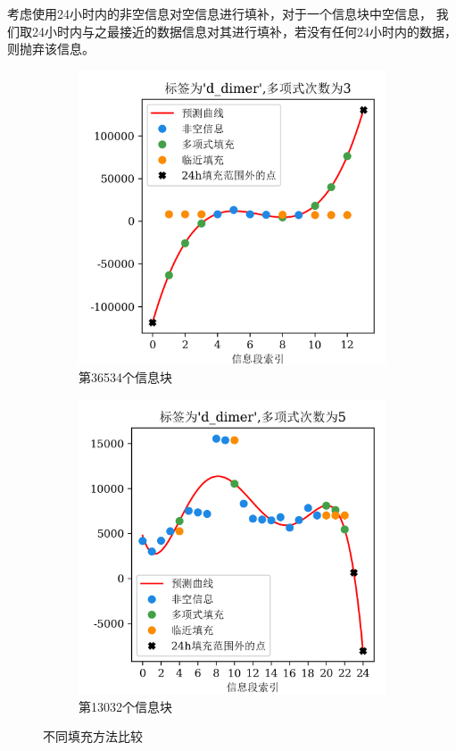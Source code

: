 \documentclass[12pt, a4paper, oneside]{ctexart}
\numberwithin{equation}{section}  %
\begin{document}
考虑使用24小时内的非空信息对空信息进行填补，对于一个信息块中空信息，
我们取24小时内与之最接近的数据信息对其进行填补，若没有任何24小时内的数据，则抛弃该信息。
\vspace{-1em}
\begin{figure}[H]
   \hspace{-1cm}
   \begin{subfigure}[b]{0.55\textwidth}
       \includegraphics[scale=0.2]{polynomial_neighbor_imputer_24hours_plot0}
       \caption{第36534个信息块}
   \end{subfigure}
   \begin{subfigure}[b]{0.6\textwidth}
       \includegraphics[scale=0.2]{polynomial_neighbor_imputer_24hours_plot1}
       \caption{第13032个信息块}
       \label{fig-regular}
   \end{subfigure}
   \caption{不同填充方法比较}
   \label{fig-imputer}
\end{figure}
\end{document}
